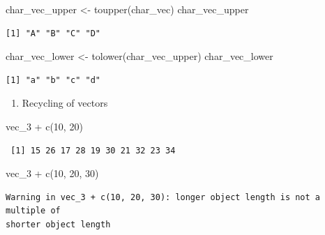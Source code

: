 \documentclass[
  letterpaper,
  DIV=11,
  numbers=noendperiod]{scrreprt}
\newenvironment{Shaded}{\begin{snugshade}}{\end{snugshade}}
\newcommand{\DecValTok}[1]{\textcolor[rgb]{0.68,0.00,0.00}{#1}}
\newcommand{\FunctionTok}[1]{\textcolor[rgb]{0.28,0.35,0.67}{#1}}
\newcommand{\NormalTok}[1]{\textcolor[rgb]{0.00,0.23,0.31}{#1}}
\newcommand{\OtherTok}[1]{\textcolor[rgb]{0.00,0.23,0.31}{#1}}
\newcommand{\SpecialCharTok}[1]{\textcolor[rgb]{0.37,0.37,0.37}{#1}}
\providecommand{\tightlist}{%
  \setlength{\itemsep}{0pt}\setlength{\parskip}{0pt}}\usepackage{longtable,booktabs,array}
\begin{document}
\begin{Shaded}
\begin{Highlighting}[]
\NormalTok{char\_vec\_upper }\OtherTok{\textless{}{-}} \FunctionTok{toupper}\NormalTok{(char\_vec)}
\NormalTok{char\_vec\_upper}
\end{Highlighting}
\end{Shaded}

\begin{verbatim}
[1] "A" "B" "C" "D"
\end{verbatim}

\begin{Shaded}
\begin{Highlighting}[]
\NormalTok{char\_vec\_lower }\OtherTok{\textless{}{-}} \FunctionTok{tolower}\NormalTok{(char\_vec\_upper)}
\NormalTok{char\_vec\_lower}
\end{Highlighting}
\end{Shaded}

\begin{verbatim}
[1] "a" "b" "c" "d"
\end{verbatim}

\begin{enumerate}
\def\labelenumi{\arabic{enumi}.}
\setcounter{enumi}{3}
\tightlist
\item
  Recycling of vectors
\end{enumerate}

\begin{Shaded}
\begin{Highlighting}[]
\NormalTok{vec\_3 }\SpecialCharTok{+} \FunctionTok{c}\NormalTok{(}\DecValTok{10}\NormalTok{, }\DecValTok{20}\NormalTok{)}
\end{Highlighting}
\end{Shaded}

\begin{verbatim}
 [1] 15 26 17 28 19 30 21 32 23 34
\end{verbatim}

\begin{Shaded}
\begin{Highlighting}[]
\NormalTok{vec\_3 }\SpecialCharTok{+} \FunctionTok{c}\NormalTok{(}\DecValTok{10}\NormalTok{, }\DecValTok{20}\NormalTok{, }\DecValTok{30}\NormalTok{) }
\end{Highlighting}
\end{Shaded}

\begin{verbatim}
Warning in vec_3 + c(10, 20, 30): longer object length is not a multiple of
shorter object length
\end{verbatim}
\end{document}
